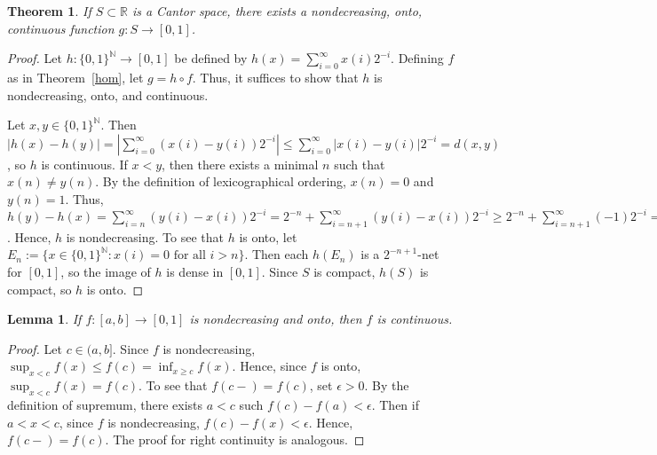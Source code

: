 \documentclass{article}
\newtheorem{theorem}{Theorem}
\newtheorem{lemma}{Lemma}
\newcommand{\R}{\mathbb{R}}
\newcommand{\N}{\mathbb{N}}
\begin{document}
\begin{theorem}\label{cfunction}
If $S \subset \R$ is a Cantor space, there exists a nondecreasing, onto, continuous function $g:S \rightarrow [0,1]$.
\end{theorem}
\begin{proof}
Let $h:{\{0,1\}}^\N \rightarrow [0,1]$ be defined by $h(x) = \sum_{i=0}^\infty x(i)2^{-i}$. Defining $f$ as in Theorem~\ref{hom}, let $g = h \circ f$. Thus, it suffices to show that $h$ is nondecreasing, onto, and continuous.

Let $x,y \in {\{0,1\}}^\N$. Then $|h(x) - h(y)| = |\sum_{i=0}^\infty (x(i)-y(i))2^{-i}| \leq \sum_{i=0}^\infty |x(i)-y(i)|2^{-i} = d(x,y)$, so $h$ is continuous. If $x<y$, then there exists a minimal $n$ such that $x(n) \neq y(n)$. By the definition of lexicographical ordering, $x(n) = 0$ and $y(n) = 1$.  Thus, $h(y) - h(x) = \sum_{i=n}^\infty (y(i)-x(i))2^{-i} = 2^{-n} + \sum_{i=n+1}^\infty (y(i)-x(i))2^{-i} \geq 2^{-n} + \sum_{i=n+1}^\infty (-1)2^{-i} = 0$. Hence, $h$ is nondecreasing. To see that $h$ is onto, let $E_n := \{x \in {\{0,1\}}^\N : x(i) = 0 \text{ for all } i>n\}$. Then each $h(E_n)$ is a $2^{-n+1}$-net for $[0,1]$, so the image of $h$ is dense in $[0,1]$.  Since $S$ is compact, $h(S)$ is compact, so $h$ is onto.
\end{proof}



\begin{lemma}\label{continuous}
If $f:[a,b] \rightarrow [0,1]$ is nondecreasing and onto, then $f$ is continuous.
\end{lemma}
\begin{proof}
Let $c \in (a,b]$.  Since $f$ is nondecreasing, $\sup_{x < c} {f(x)} \leq f(c) = \inf_{x \geq c} {f(x)}$. Hence, since $f$ is onto, $\sup_{x < c} {f(x)} = f(c)$.
To see that $f(c-) = f(c)$, set $\epsilon > 0$. By the definition of supremum, there exists $a<c$ such $f(c) - f(a) < \epsilon$. Then if $a<x<c$, since $f$ is nondecreasing, 
$f(c) - f(x) < \epsilon$. Hence, $f(c-) = f(c)$.  The proof for right continuity is analogous.
\end{proof}
\end{document}
